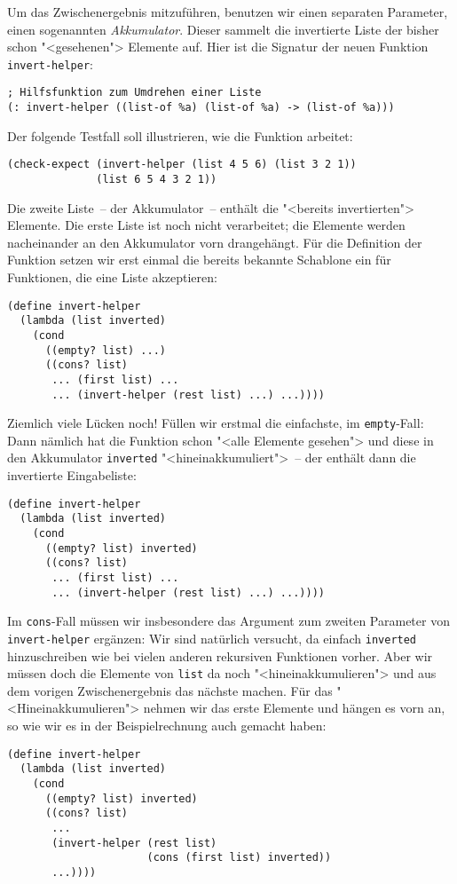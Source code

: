 Um das Zwischenergebnis mitzuführen, 
benutzen wir einen separaten Parameter, einen sogenannten
\textit{Akkumulator}.  Dieser sammelt die
invertierte Liste der bisher schon "<gesehenen"> Elemente auf.  Hier
ist die Signatur der neuen Funktion \lstinline{invert-helper}:
%
\begin{lstlisting}
; Hilfsfunktion zum Umdrehen einer Liste
(: invert-helper ((list-of %a) (list-of %a) -> (list-of %a)))
\end{lstlisting}
%
Der folgende Testfall soll illustrieren, wie die Funktion arbeitet:
\begin{lstlisting}
(check-expect (invert-helper (list 4 5 6) (list 3 2 1))
              (list 6 5 4 3 2 1))
\end{lstlisting}
%
Die zweite Liste~-- der Akkumulator~-- enthält die "<bereits
invertierten"> Elemente.  Die erste Liste ist noch nicht verarbeitet;
die Elemente werden nacheinander an den Akkumulator vorn drangehängt.
Für die Definition der Funktion setzen wir erst einmal die bereits
bekannte Schablone ein für Funktionen, die eine Liste akzeptieren:
%
\begin{lstlisting}
(define invert-helper
  (lambda (list inverted)
    (cond
      ((empty? list) ...)
      ((cons? list)
       ... (first list) ...
       ... (invert-helper (rest list) ...) ...))))
\end{lstlisting}
%
Ziemlich viele Lücken noch!  Füllen wir erstmal die einfachste, im
\lstinline{empty}-Fall: Dann nämlich hat die Funktion schon "<alle
Elemente gesehen"> und diese in den Akkumulator \lstinline{inverted}
"<hineinakkumuliert">~-- der enthält dann die invertierte
Eingabeliste:
%
\begin{lstlisting}
(define invert-helper
  (lambda (list inverted)
    (cond
      ((empty? list) inverted)
      ((cons? list)
       ... (first list) ...
       ... (invert-helper (rest list) ...) ...))))
\end{lstlisting}
%
Im \lstinline{cons}-Fall müssen wir insbesondere das Argument zum zweiten
Parameter von \lstinline{invert-helper} ergänzen: Wir sind natürlich
versucht, da einfach \lstinline{inverted} hinzuschreiben wie bei
vielen anderen rekursiven Funktionen vorher.  Aber wir müssen doch die
Elemente von \lstinline{list} da noch "<hineinakkumulieren"> und aus
dem vorigen Zwischenergebnis das nächste machen.  Für das
"<Hineinakkumulieren"> nehmen wir das erste Elemente und hängen es
vorn an, so wie wir es in der Beispielrechnung auch gemacht haben:
%
\begin{lstlisting}
(define invert-helper
  (lambda (list inverted)
    (cond
      ((empty? list) inverted)
      ((cons? list)
       ...
       (invert-helper (rest list)
                      (cons (first list) inverted))
       ...))))
\end{lstlisting}
